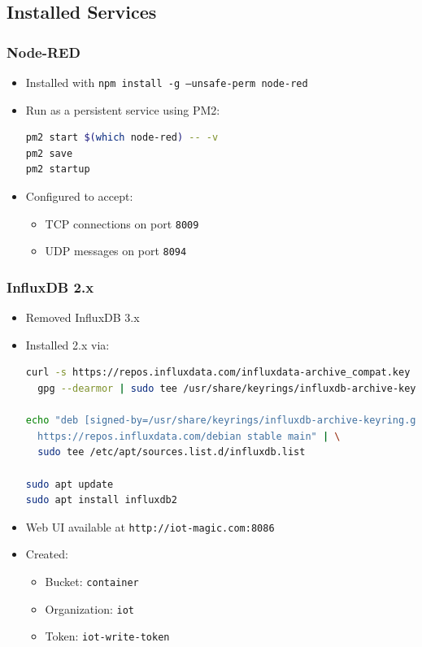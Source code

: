 \documentclass[11pt,a4paper]{article}
\begin{document}
\subsection*{Installed Services}

\subsubsection*{Node-RED}
\begin{itemize}
  \item Installed with \texttt{npm install -g --unsafe-perm node-red}
  \item Run as a persistent service using PM2:
  \begin{lstlisting}[language=bash]
pm2 start $(which node-red) -- -v
pm2 save
pm2 startup
\end{lstlisting}
  \item Configured to accept:
    \begin{itemize}
      \item TCP connections on port \texttt{8009}
      \item UDP messages on port \texttt{8094}
    \end{itemize}
\end{itemize}

\subsubsection*{InfluxDB 2.x}
\begin{itemize}
  \item Removed InfluxDB 3.x
  \item Installed 2.x via:
  \begin{lstlisting}[language=bash]
curl -s https://repos.influxdata.com/influxdata-archive_compat.key | \
  gpg --dearmor | sudo tee /usr/share/keyrings/influxdb-archive-keyring.gpg > /dev/null

echo "deb [signed-by=/usr/share/keyrings/influxdb-archive-keyring.gpg] \
  https://repos.influxdata.com/debian stable main" | \
  sudo tee /etc/apt/sources.list.d/influxdb.list

sudo apt update
sudo apt install influxdb2
\end{lstlisting}
  \item Web UI available at \texttt{http://iot-magic.com:8086}
  \item Created:
    \begin{itemize}
      \item Bucket: \texttt{container}
      \item Organization: \texttt{iot}
      \item Token: \texttt{iot-write-token}
    \end{itemize}
\end{itemize}
\end{document}
